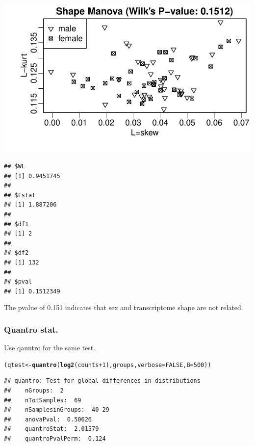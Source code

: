 \documentclass{article}\usepackage[]{graphicx}\usepackage[usenames,dvipsnames]{color}
\makeatletter
\def\maxwidth{ %
  \ifdim\Gin@nat@width>\linewidth
    \linewidth
  \else
    \Gin@nat@width
  \fi
}
\newcommand{\hlnum}[1]{\textcolor[rgb]{0.686,0.059,0.569}{#1}}%
\newcommand{\hlopt}[1]{\textcolor[rgb]{0,0,0}{#1}}%
\newcommand{\hlstd}[1]{\textcolor[rgb]{0.345,0.345,0.345}{#1}}%
\newcommand{\hlkwb}[1]{\textcolor[rgb]{0.69,0.353,0.396}{#1}}%
\newcommand{\hlkwc}[1]{\textcolor[rgb]{0.333,0.667,0.333}{#1}}%
\newcommand{\hlkwd}[1]{\textcolor[rgb]{0.737,0.353,0.396}{\textbf{#1}}}%
\newenvironment{kframe}{%
 \def\at@end@of@kframe{}%
 \ifinner\ifhmode%
  \def\at@end@of@kframe{\end{minipage}}%
  \begin{minipage}{\columnwidth}%
 \fi\fi%
 \def\FrameCommand##1{\hskip\@totalleftmargin \hskip-\fboxsep
 \colorbox{shadecolor}{##1}\hskip-\fboxsep
     \hskip-\linewidth \hskip-\@totalleftmargin \hskip\columnwidth}%
 \MakeFramed {\advance\hsize-\width
   \@totalleftmargin\z@ \linewidth\hsize
   \@setminipage}}%
 {\par\unskip\endMakeFramed%
 \at@end@of@kframe}
\newenvironment{knitrout}{}{} %
\makeatother
\begin{document}
\begin{knitrout}
\color{fgcolor}

{\centering \includegraphics[width=\maxwidth]{figure/lrats-1} 

}


\begin{kframe}\begin{verbatim}
## $WL
## [1] 0.9451745
## 
## $Fstat
## [1] 1.887206
## 
## $df1
## [1] 2
## 
## $df2
## [1] 132
## 
## $pval
## [1] 0.1512349
\end{verbatim}
\end{kframe}
\end{knitrout}

The pvalue of 0.151 indicates that sex and transcriptome shape are not
related.

\subsubsection{Quantro stat.}

Use qauntro for the same test. 

\begin{knitrout}
\color{fgcolor}\begin{kframe}
\begin{alltt}
\hlstd{(qtest} \hlkwb{<-} \hlkwd{quantro}\hlstd{(}\hlkwd{log2}\hlstd{(counts}\hlopt{+}\hlnum{1}\hlstd{), groups,} \hlkwc{verbose}\hlstd{=}\hlnum{FALSE}\hlstd{,} \hlkwc{B}\hlstd{=}\hlnum{500}\hlstd{))}
\end{alltt}
\begin{verbatim}
## quantro: Test for global differences in distributions
##    nGroups:  2 
##    nTotSamples:  69 
##    nSamplesinGroups:  40 29 
##    anovaPval:  0.50626 
##    quantroStat:  2.01579 
##    quantroPvalPerm:  0.124
\end{verbatim}
\end{kframe}
\end{knitrout}
\end{document}
